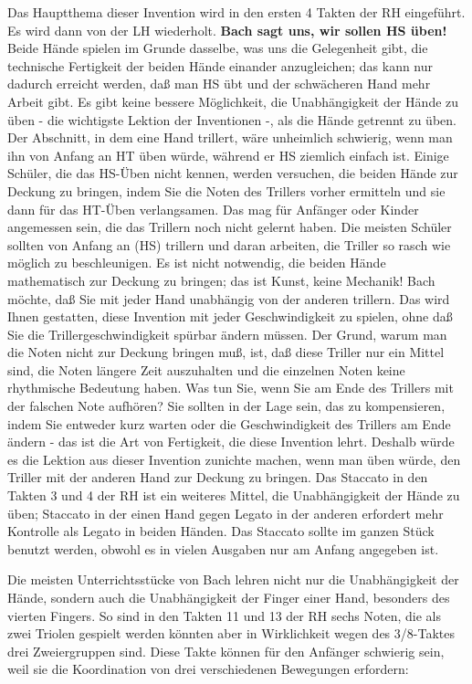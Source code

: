 Das Hauptthema dieser Invention wird in den ersten 4 Takten der RH eingeführt.
Es wird dann von der LH wiederholt.
\textbf{Bach sagt uns, wir sollen HS üben!}
Beide Hände spielen im Grunde dasselbe, was uns die Gelegenheit gibt, die technische Fertigkeit der beiden Hände einander anzugleichen; das kann nur dadurch erreicht werden, daß man HS übt und der schwächeren Hand mehr Arbeit gibt.
Es gibt keine bessere Möglichkeit, die Unabhängigkeit der Hände zu üben - die wichtigste Lektion der Inventionen -, als die Hände getrennt zu üben.
Der Abschnitt, in dem eine Hand trillert, wäre unheimlich schwierig, wenn man ihn von Anfang an HT üben würde, während er HS ziemlich einfach ist.
Einige Schüler, die das HS-Üben nicht kennen, werden versuchen, die beiden Hände zur Deckung zu bringen, indem Sie die Noten des Trillers vorher ermitteln und sie dann für das HT-Üben verlangsamen.
Das mag für Anfänger oder Kinder angemessen sein, die das Trillern noch nicht gelernt haben.
Die meisten Schüler sollten von Anfang an (HS) trillern und daran arbeiten, die Triller so rasch wie möglich zu beschleunigen.
Es ist nicht notwendig, die beiden Hände mathematisch zur Deckung zu bringen; das ist Kunst, keine Mechanik!
Bach möchte, daß Sie mit jeder Hand unabhängig von der anderen trillern.
Das wird Ihnen gestatten, diese Invention mit jeder Geschwindigkeit zu spielen, ohne daß Sie die Trillergeschwindigkeit spürbar ändern müssen.
Der Grund, warum man die Noten nicht zur Deckung bringen muß, ist, daß diese Triller nur ein Mittel sind, die Noten längere Zeit auszuhalten und die einzelnen Noten keine rhythmische Bedeutung haben.
Was tun Sie, wenn Sie am Ende des Trillers mit der falschen Note aufhören?
Sie sollten in der Lage sein, das zu kompensieren, indem Sie entweder kurz warten oder die Geschwindigkeit des Trillers am Ende ändern - das ist die Art von Fertigkeit, die diese Invention lehrt.
Deshalb würde es die Lektion aus dieser Invention zunichte machen, wenn man üben würde, den Triller mit der anderen Hand zur Deckung zu bringen.
Das Staccato in den Takten 3 und 4 der RH ist ein weiteres Mittel, die Unabhängigkeit der Hände zu üben; Staccato in der einen Hand gegen Legato in der anderen erfordert mehr Kontrolle als Legato in beiden Händen.
Das Staccato sollte im ganzen Stück benutzt werden, obwohl es in vielen Ausgaben nur am Anfang angegeben ist.

Die meisten Unterrichtsstücke von Bach lehren nicht nur die Unabhängigkeit der Hände, sondern auch die Unabhängigkeit der Finger einer Hand, besonders des vierten Fingers.
So sind in den Takten 11 und 13 der RH sechs Noten, die als zwei Triolen gespielt werden könnten aber in Wirklichkeit wegen des 3/8-Taktes drei Zweiergruppen sind.
Diese Takte können für den Anfänger schwierig sein, weil sie die Koordination von drei verschiedenen Bewegungen erfordern:

